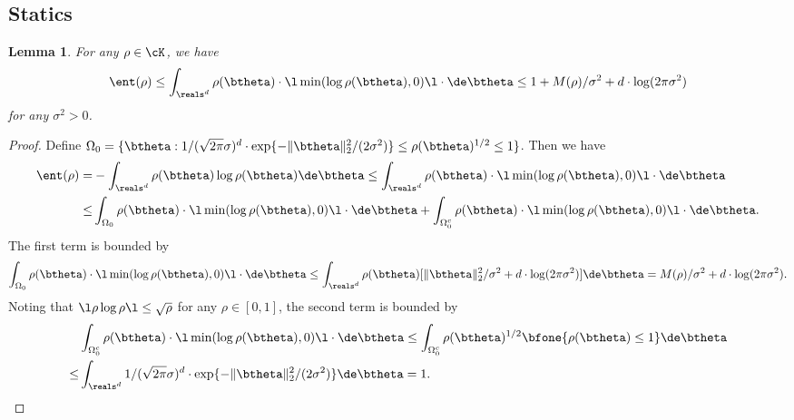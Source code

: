 \documentclass[11pt]{article}
\newtheorem{lemma}{Lemma}
\begin{document}
\subsection{Statics}
\label{sec:Statics_finite_T}


%
\begin{lemma}\label{lem:Bound_H_by_M}
For any $\rho \in \cK$, we have 
\begin{align}\label{eqn:Bound_H_by_M}
\ent(\rho) \le \int_{\reals^d} \rho(\btheta) \cdot \l \min(\log \rho(\btheta), 0 )\l \cdot \de \btheta \le 1 + M(\rho)/\sigma^2 + d \cdot \log (2\pi \sigma^2)
\end{align}
for any $\sigma^2 > 0$. 
\end{lemma}

\begin{proof}

Define $\Omega_0 = \{ \btheta: 1/(\sqrt{2\pi} \sigma)^d \cdot \exp\{ - \| \btheta \|_2^2/(2\sigma^2) \} \le \rho(\btheta)^{1/2} \le 1 \}$. Then we have 
\[
\begin{aligned}
\ent(\rho) =& - \int_{\reals^d} \rho(\btheta) \log \rho(\btheta) \de \btheta \le \int_{\reals^d} \rho(\btheta) \cdot \l \min(\log \rho(\btheta), 0 )\l \cdot \de \btheta\\
\le&\int_{\Omega_0} \rho(\btheta) \cdot \l \min(\log \rho(\btheta), 0 )\l \cdot \de \btheta + \int_{\Omega_0^c} \rho(\btheta) \cdot \l \min(\log \rho(\btheta), 0 )\l \cdot \de \btheta.
\end{aligned}
\]
The first term is bounded by 
\[
\begin{aligned}
\int_{\Omega_0} \rho(\btheta) \cdot \l \min(\log \rho(\btheta), 0 )\l \cdot \de \btheta \le \int_{\reals^d} \rho(\btheta) [\| \btheta \|_2^2/\sigma^2 + d \cdot \log(2 \pi \sigma^2)] \de \btheta = M(\rho)/\sigma^2 + d \cdot \log(2 \pi \sigma^2). 
\end{aligned}
\]
Noting that $\l \rho \log\rho\l \le \sqrt{\rho}$ for any $\rho \in [0, 1]$, the second term is bounded by
\[
\begin{aligned}
&\int_{\Omega_0^c} \rho(\btheta) \cdot \l \min(\log \rho(\btheta), 0 )\l \cdot \de \btheta \le \int_{\Omega_0^c} \rho(\btheta)^{1/2} \bfone\{ \rho(\btheta) \le 1 \} \de \btheta \\
\le& \int_{\reals^d} 1/(\sqrt{2\pi} \sigma)^d \cdot \exp\{ - \| \btheta \|_2^2/(2\sigma^2) \} \de \btheta =1. 
\end{aligned}
\]

\end{proof}
\end{document}
